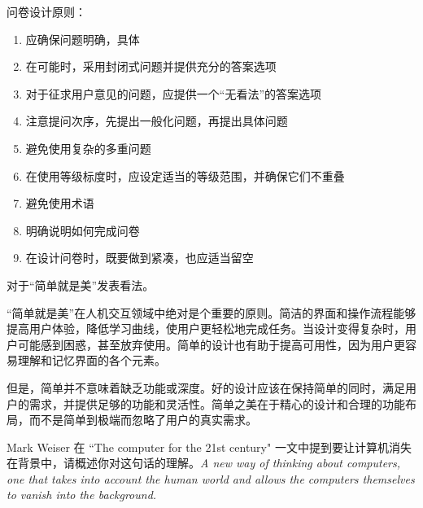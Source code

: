 \begin{solution}
问卷设计原则：
\vspace{-0.8em}
\begin{multicols}{2}
    \begin{enumerate}[label=\arabic*.]
        \item 应确保问题明确，具体
        \item 在可能时，采用封闭式问题并提供充分的答案选项
        \item 对于征求用户意见的问题，应提供一个“无看法”的答案选项
        \item 注意提问次序，先提出一般化问题，再提出具体问题
        \item 避免使用复杂的多重问题
        \item 在使用等级标度时，应设定适当的等级范围，并确保它们不重叠
        \item 避免使用术语
        \item 明确说明如何完成问卷
        \item 在设计问卷时，既要做到紧凑，也应适当留空
    \end{enumerate}
\end{multicols}
\vspace{-1em}
\end{solution}



\begin{problem}[2014]
对于“简单就是美”发表看法。
\end{problem}

\begin{solution}
“简单就是美”在人机交互领域中绝对是个重要的原则。简洁的界面和操作流程能够提高用户体验，降低学习曲线，使用户更轻松地完成任务。当设计变得复杂时，用户可能感到困惑，甚至放弃使用。简单的设计也有助于提高可用性，因为用户更容易理解和记忆界面的各个元素。

但是，简单并不意味着缺乏功能或深度。好的设计应该在保持简单的同时，满足用户的需求，并提供足够的功能和灵活性。简单之美在于精心的设计和合理的功能布局，而不是简单到极端而忽略了用户的真实需求。
\end{solution}



\begin{problem}[2022]
Mark Weiser 在 ``The computer for the 21st century" 一文中提到要让计算机消失在背景中，请概述你对这句话的理解。\textit{A new way of thinking about computers, one that takes into account the human world and allows the computers themselves to vanish into the background.}
\end{problem}


